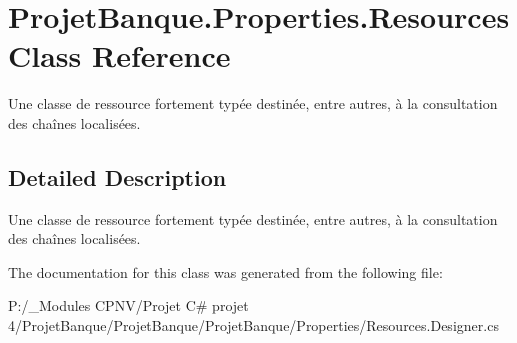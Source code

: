 \hypertarget{class_projet_banque_1_1_properties_1_1_resources}{}\section{Projet\+Banque.\+Properties.\+Resources Class Reference}
\label{class_projet_banque_1_1_properties_1_1_resources}


Une classe de ressource fortement typée destinée, entre autres, à la consultation des chaînes localisées.  




\subsection{Detailed Description}
Une classe de ressource fortement typée destinée, entre autres, à la consultation des chaînes localisées. 



The documentation for this class was generated from the following file\+:\begin{DoxyCompactItemize}
\item 
P\+:/\+\_\+\+Modules C\+P\+N\+V/\+Projet C\# projet 4/\+Projet\+Banque/\+Projet\+Banque/\+Projet\+Banque/\+Properties/Resources.\+Designer.\+cs\end{DoxyCompactItemize}
